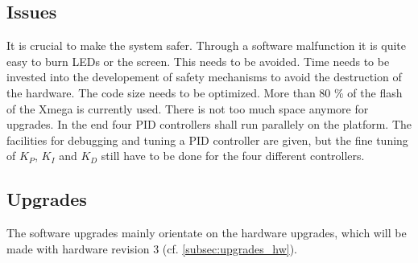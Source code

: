 \subsection{Issues}
It is crucial to make the system safer. Through a software malfunction it is
quite easy to burn LEDs or the screen. This needs to be avoided. Time needs to
be invested into the developement of safety mechanisms to avoid the destruction
of the hardware.
\newpar
The code size needs to be optimized. More than 80 \% of the flash of the Xmega
is currently used. There is not too much space anymore for upgrades. 
\newpar
In the end four PID controllers shall run parallely on the platform. The
facilities for debugging and tuning a PID controller are given, but the fine
tuning of \ensuremath{K_P}, \ensuremath{K_I} and
\ensuremath{K_D} still have to be done for the four different controllers. 
\subsection{Upgrades}
The software upgrades mainly orientate on the hardware upgrades, which will be
made with hardware revision 3 (cf. \ref{subsec:upgrades_hw}).
